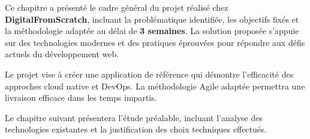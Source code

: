 Ce chapitre a présenté le cadre général du projet réalisé chez \textcolor{accentgreen}{\textbf{DigitalFromScratch}}, incluant la problématique identifiée, les objectifs fixés et la méthodologie adaptée au délai de \textbf{\color{primaryblue}3 semaines}. La solution proposée s'appuie sur des technologies modernes et des pratiques éprouvées pour répondre aux défis actuels du développement web.

\begin{warningbox}
Le projet vise à créer une application de référence qui démontre l'efficacité des approches cloud native et DevOps. La méthodologie Agile adaptée permettra une livraison efficace dans les temps impartis.
\end{warningbox}

Le chapitre suivant présentera l'étude préalable, incluant l'analyse des technologies existantes et la justification des choix techniques effectués. 